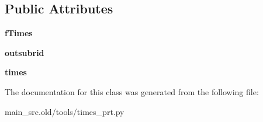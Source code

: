 \subsection*{Public Attributes}
\begin{DoxyCompactItemize}
\item 
\hypertarget{classmain__src_8old_1_1tools_1_1times__prt_1_1TimesPrt_a92750dc21c26226d5bd8bfcc2b36952c}{{\bfseries f\-Times}}\label{classmain__src_8old_1_1tools_1_1times__prt_1_1TimesPrt_a92750dc21c26226d5bd8bfcc2b36952c}

\item 
\hypertarget{classmain__src_8old_1_1tools_1_1times__prt_1_1TimesPrt_a7d648f03c6b91df0c182d02cec02e110}{{\bfseries outsubrid}}\label{classmain__src_8old_1_1tools_1_1times__prt_1_1TimesPrt_a7d648f03c6b91df0c182d02cec02e110}

\item 
\hypertarget{classmain__src_8old_1_1tools_1_1times__prt_1_1TimesPrt_ad71c9e4f391a43d1377fbe633fd7507a}{{\bfseries times}}\label{classmain__src_8old_1_1tools_1_1times__prt_1_1TimesPrt_ad71c9e4f391a43d1377fbe633fd7507a}

\end{DoxyCompactItemize}


The documentation for this class was generated from the following file\-:\begin{DoxyCompactItemize}
\item 
main\-\_\-src.\-old/tools/times\-\_\-prt.\-py\end{DoxyCompactItemize}
